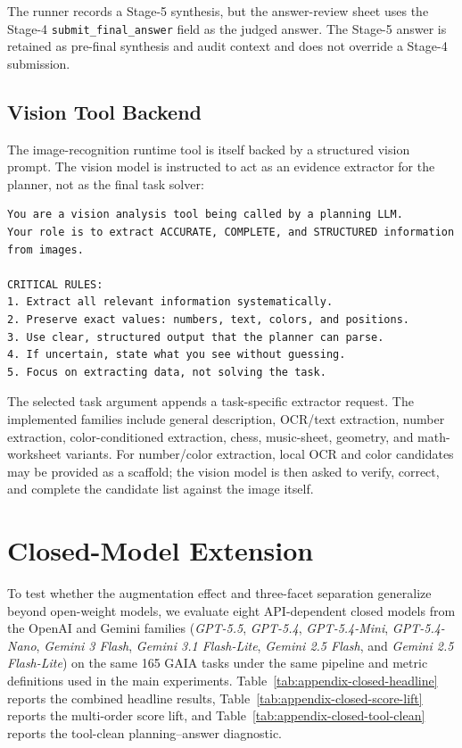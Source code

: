 \documentclass{article}
\providecommand{\model}[1]{\emph{#1}}
\begin{document}
The runner records a Stage-5 synthesis, but the answer-review sheet uses the
Stage-4 \texttt{submit\_final\_answer} field as the judged answer. The Stage-5
answer is retained as pre-final synthesis and audit context and does not
override a Stage-4 submission.

\subsection{Vision Tool Backend}
\label{subsec:appendix-vision-tool}

The image-recognition runtime tool is itself backed by a structured vision
prompt. The vision model is instructed to act as an evidence extractor for the
planner, not as the final task solver:

\begin{lstlisting}
You are a vision analysis tool being called by a planning LLM.
Your role is to extract ACCURATE, COMPLETE, and STRUCTURED information from images.

CRITICAL RULES:
1. Extract all relevant information systematically.
2. Preserve exact values: numbers, text, colors, and positions.
3. Use clear, structured output that the planner can parse.
4. If uncertain, state what you see without guessing.
5. Focus on extracting data, not solving the task.
\end{lstlisting}

The selected task argument appends a task-specific extractor request. The
implemented families include general description, OCR/text extraction,
number extraction, color-conditioned extraction, chess, music-sheet, geometry,
and math-worksheet variants. For number/color extraction, local OCR and color
candidates may be provided as a scaffold; the vision model is then asked to
verify, correct, and complete the candidate list against the image itself.



\FloatBarrier
\clearpage
\section{Closed-Model Extension}
\label{sec:appendix-closed-model}

To test whether the augmentation effect and three-facet separation generalize
beyond open-weight models, we evaluate eight API-dependent closed models from
the OpenAI and Gemini families (\model{GPT-5.5}, \model{GPT-5.4},
\model{GPT-5.4-Mini}, \model{GPT-5.4-Nano},
\model{Gemini 3 Flash}, \model{Gemini 3.1 Flash-Lite},
\model{Gemini 2.5 Flash}, and \model{Gemini 2.5 Flash-Lite}) on the same 165 GAIA tasks under the same
pipeline and metric definitions used in the main experiments. Table~\ref{tab:appendix-closed-headline}
reports the combined headline results, Table~\ref{tab:appendix-closed-score-lift}
reports the multi-order score lift, and Table~\ref{tab:appendix-closed-tool-clean}
reports the tool-clean planning--answer diagnostic.
\end{document}
